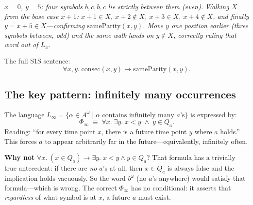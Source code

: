 \begin{example}
\begin{center}
  \par
  {\small\itshape $x=0$, $y=5$: four symbols $b,c,b,c$ lie strictly
  between them (even).  Walking $X$ from the base case $x{+}1$:
  $x{+}1\in X$, $x{+}2\notin X$, $x{+}3\in X$, $x{+}4\notin X$, and
  finally $y=x{+}5 \in X$---confirming $\mathrm{sameParity}(x,y)$.  Move
  $y$ one position earlier (three symbols between, odd) and the same
  walk lands on $y \notin X$, correctly ruling that word out of $L_3$.}
\end{center}

The full S1S sentence:
\[
  \forall x, y.\;
  \mathrm{consec}(x, y) \to \mathrm{sameParity}(x, y).
\]
\end{example}

\subsection{The key pattern: infinitely many occurrences}
\label{sec:s1s-infinitely}

\begin{example}
\label{ex:s1s-infmany}
The language $L_\infty = \{\alpha \in A^\omega \mid \alpha \text{ contains
infinitely many } a\text{'s}\}$ is expressed by:
\[
  \Phi_\infty \;\equiv\; \forall x.\;\exists y.\; x < y \;\land\; y \in Q_a.
\]
Reading: ``for every time point $x$, there is a future time point $y$
where $a$ holds.''  This forces $a$ to appear arbitrarily far in the
future---equivalently, infinitely often.

\medskip\noindent
\textbf{Why not} $\forall x.\;(x \in Q_a) \to \exists y.\;x < y \land y \in Q_a$?
That formula has a trivially true antecedent: if there are \emph{no} $a$'s
at all, then $x \in Q_a$ is always false and the implication holds vacuously.
So the word $b^\omega$ (no $a$'s anywhere) would satisfy that formula---which
is wrong.  The correct $\Phi_\infty$ has no conditional: it asserts that
\emph{regardless} of what symbol is at $x$, a future $a$ must exist.
\end{example}

